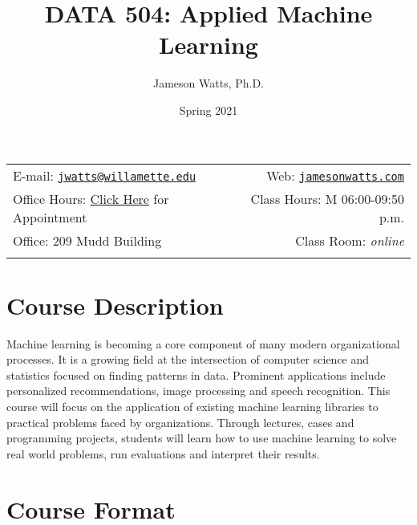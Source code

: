 \documentclass[11pt,]{article}
\title{DATA 504: Applied Machine Learning}
\author{Jameson Watts, Ph.D.}
\date{Spring 2021}
\begin{document}
  

		\maketitle
		
	
		\thispagestyle{firststyle}



	\noindent \begin{tabular*}{\textwidth}{ @{\extracolsep{\fill}} lr @{\extracolsep{\fill}}}


E-mail: \texttt{\href{mailto:jwatts@willamette.edu}{\nolinkurl{jwatts@willamette.edu}}} & Web: \href{http://jamesonwatts.com}{\tt jamesonwatts.com}\\
Office Hours: \href{https://calendar.google.com/calendar/u/0/selfsched?sstoken=UUltRXJtZHQwTXlHfGRlZmF1bHR8YzBkZmIzM2IwZDg4ODhiNDc0NTgzZTAwOGU2YTI3ZDk}{Click
Here} for Appointment  &  Class Hours: M 06:00-09:50 p.m.\\
Office: 209 Mudd Building  & Class Room: \emph{online}\\
	&  \\
	\hline
	\end{tabular*}
	
\vspace{2mm}
	


\hypertarget{course-description}{%
\section{Course Description}\label{course-description}}

Machine learning is becoming a core component of many modern
organizational processes. It is a growing field at the intersection of
computer science and statistics focused on finding patterns in data.
Prominent applications include personalized recommendations, image
processing and speech recognition. This course will focus on the
application of existing machine learning libraries to practical problems
faced by organizations. Through lectures, cases and programming
projects, students will learn how to use machine learning to solve real
world problems, run evaluations and interpret their results.

\hypertarget{course-format}{%
\section{Course Format}\label{course-format}}
\end{document}
